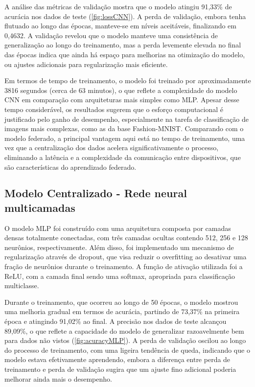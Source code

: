 A análise das métricas de validação mostra que o modelo atingiu 91,33\% de acurácia nos dados de teste (\ref{fig:lossCNN}). A perda de validação, embora tenha flutuado ao longo das épocas, manteve-se em níveis aceitáveis, finalizando em 0,4632. A validação revelou que o modelo manteve uma consistência de generalização ao longo do treinamento, mas a perda levemente elevada no final das épocas indica que ainda há espaço para melhorias na otimização do modelo, ou ajustes adicionais para regularização mais eficiente.

Em termos de tempo de treinamento, o modelo foi treinado por aproximadamente 3816 segundos (cerca de 63 minutos), o que reflete a complexidade do modelo CNN em comparação com arquiteturas mais simples como MLP. Apesar desse tempo considerável, os resultados sugerem que o esforço computacional é justificado pelo ganho de desempenho, especialmente na tarefa de classificação de imagens mais complexas, como as da base Fashion-MNIST. Comparando com o modelo federado, a principal vantagem aqui está no tempo de treinamento, uma vez que a centralização dos dados acelera significativamente o processo, eliminando a latência e a complexidade da comunicação entre dispositivos, que são características do aprendizado federado.

\subsection{Modelo Centralizado - Rede neural multicamadas}

O modelo MLP foi construído com uma arquitetura composta por camadas densas totalmente conectadas, com três camadas ocultas contendo 512, 256 e 128 neurônios, respectivamente. Além disso, foi implementado um mecanismo de regularização através de dropout, que visa reduzir o overfitting ao desativar uma fração de neurônios durante o treinamento. A função de ativação utilizada foi a ReLU, com a camada final sendo uma softmax, apropriada para classificação multiclasse.

Durante o treinamento, que ocorreu ao longo de 50 épocas, o modelo mostrou uma melhoria gradual em termos de acurácia, partindo de 73,37\% na primeira época e atingindo 91,02\% ao final. A precisão nos dados de teste alcançou 89,09\%, o que reflete a capacidade do modelo de generalizar razoavelmente bem para dados não vistos (\ref{fig:acuracyMLP}). A perda de validação oscilou ao longo do processo de treinamento, com uma ligeira tendência de queda, indicando que o modelo estava efetivamente aprendendo, embora a diferença entre perda de treinamento e perda de validação sugira que um ajuste fino adicional poderia melhorar ainda mais o desempenho.

